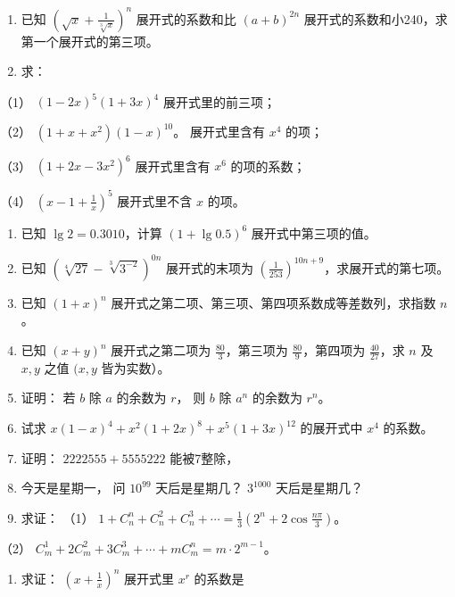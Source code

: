 \begin{enumerate}
\item
  已知 \(\left(\sqrt{x} + \frac{1}{\sqrt[3]{x}}\right)^n\)
  展开式的系数和比 \((a + b)^{2n}\)
  展开式的系数和小240，求第一个展开式的第三项。
\item
  求：
\end{enumerate}

（1） \((1 - 2x)^{5}(1 + 3x)^{4}\) 展开式里的前三项；

（2） \((1 + x + x^2)(1 - x)^{10}\)。 展开式里含有 \(x^4\) 的项；

（3） \((1 + 2x - 3x^2)^6\) 展开式里含有 \(x^6\) 的项的系数；

（4） \(\left(x - 1 + \frac{1}{x}\right)^5\) 展开式里不含 \(x\) 的项。

\begin{enumerate}[start=3]
\item
  已知 \(\lg 2 = 0.3010\)，计算 \((1 + \lg 0.5)^6\) 展开式中第三项的值。
\item
  已知 \((\sqrt[4]{27} - \sqrt[3]{3^{-2}})^{0n}\) 展开式的末项为
  \(\left(\frac{1}{253}\right)^{10n+9}\)，求展开式的第七项。
\item
  已知 \((1 + x)^n\)
  展开式之第二项、第三项、第四项系数成等差数列，求指数 \(n\)。
\item
  已知 \((x + y)^n\) 展开式之第二项为 \(\frac{80}{3}\)，第三项为
  \(\frac{80}{9}\)，第四项为 \(\frac{40}{27}\)，求 \(n\) 及 \(x, y\)
  之值 \((x, y\) 皆为实数）。
\item
  证明： 若 \(b\) 除 \(a\) 的余数为 \(r\)， 则 \(b\) 除 \(a^n\) 的余数为
  \(r^n\)。
\item
  试求 \(x(1 - x)^4 + x^2(1 + 2x)^8 + x^5(1 + 3x)^{12}\) 的展开式中
  \(x^4\) 的系数。
\item
  证明： \(2222555 + 5555222\) 能被7整除，
\item
  今天是星期一， 问 \(10^{99}\) 天后是星期几？ \(3^{1000}\)
  天后是星期几？
\item
  求证： （1）
  \(1 + C_{n}^{n} + C_{n}^{2} + C_{n}^{3} + \cdots = \frac{1}{3}\left(2^{n} + 2\cos \frac{n\pi}{3}\right)\)。
\end{enumerate}

（2）
\(C_{m}^{1} + 2C_{m}^{2} + 3C_{m}^{3} + \cdots + mC_{m}^{n} = m \cdot 2^{m - 1}\)。

\begin{enumerate}[start=12]
\item
  求证： \(\left(x+\frac{1}{x}\right)^{n}\) 展开式里 \(x^{r}\) 的系数是
\end{enumerate}

